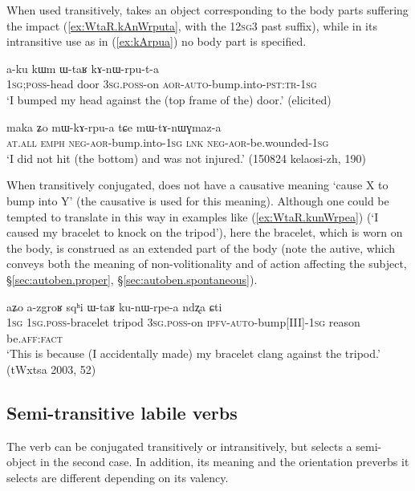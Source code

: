 When used transitively,  takes an object corresponding to the body parts suffering the impact (\ref{ex:WtaR.kAnWrputa}, with the 12\textsc{sg}\fl{}3 past  suffix), while in its intransitive use as in (\ref{ex:kArpua}) no body part is specified.

 \begin{exe}
\ex \label{ex:WtaR.kAnWrputa}
\gll  a-ku kɯm ɯ-taʁ kɤ-nɯ-rpu-t-a \\
\textsc{1sg};\textsc{poss}-head door \textsc{3sg}.\textsc{poss}-on \textsc{aor}-\textsc{auto}-bump.into-\textsc{pst}:\textsc{tr}-\textsc{1sg} \\
\glt  `I bumped my head against the (top frame of the) door.' (elicited)
\end{exe}

 \begin{exe}
\ex \label{ex:kArpua}
\gll maka ʑo mɯ-kɤ-rpu-a tɕe mɯ-tɤ-nɯɣmaz-a \\
\textsc{at}.\textsc{all} \textsc{emph} \textsc{neg}-\textsc{aor}-bump.into-\textsc{1sg} \textsc{lnk} \textsc{neg}-\textsc{aor}-be.wounded-\textsc{1sg} \\
\glt  `I did not hit (the bottom) and was not injured.' (150824 kelaosi-zh, 190)
\end{exe}

When transitively conjugated,  does not have a causative meaning `cause X to bump into Y' (the causative  is used for this meaning). Although one could be tempted to translate  in this way in examples like (\ref{ex:WtaR.kunWrpea}) (`I caused my bracelet to knock on the tripod'), here the bracelet, which is worn on the body, is construed as an extended part of the body (note the autive, which conveys both the meaning of non-volitionality and of action affecting the subject, §\ref{sec:autoben.proper}, §\ref{sec:autoben.spontaneous}).

 \begin{exe}
\ex \label{ex:WtaR.kunWrpea}
\gll   aʑo a-zgroʁ sqʰi ɯ-taʁ ku-nɯ-rpe-a ndʐa ɕti \\
\textsc{1sg} \textsc{1sg}.\textsc{poss}-bracelet tripod \textsc{3sg}.\textsc{poss}-on \textsc{ipfv}-\textsc{auto}-bump[III]-\textsc{1sg} reason be.\textsc{aff}:\textsc{fact} \\
\glt `This is because (I accidentally made) my bracelet clang against the tripod.' (tWxtsa 2003, 52)
\end{exe}

\subsection{Semi-transitive labile verbs}\label{sec:semi.tr.labile}
The verb  can be conjugated transitively or intransitively, but selects a semi-object in the second case. In addition, its meaning and the orientation preverbs it selects are different depending on its valency.

